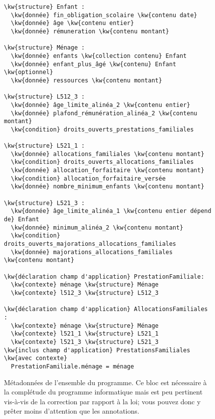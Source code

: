 \documentclass[12pt, french]{article}
\newcommand{\kw}[1]{\textbf{\textcolor{OliveGreen}{#1}}}
\newenvironment{metadata}{
  \begin{tcolorbox}[colframe=OliveGreen, title=\textcolor{black}{\texttt{Métadonnées}}, before skip=1em, after skip=1em]
}{
\end{tcolorbox}
}
\begin{document}
\begin{figure}[htpb]
\begin{metadata}
\begin{Verbatim}[commandchars=\\\{\}]
\kw{structure} Enfant :
  \kw{donnée} fin_obligation_scolaire \kw{contenu date}
  \kw{donnée} âge \kw{contenu entier}
  \kw{donnée} rémuneration \kw{contenu montant}

\kw{structure} Ménage :
  \kw{donnée} enfants \kw{collection contenu} Enfant
  \kw{donnée} enfant_plus_âgé \kw{contenu} Enfant \kw{optionnel}
  \kw{donnée} ressources \kw{contenu montant}

\kw{structure} L512_3 :
  \kw{donnée} âge_limite_alinéa_2 \kw{contenu entier}
  \kw{donnée} plafond_rémunération_alinéa_2 \kw{contenu montant}
  \kw{condition} droits_ouverts_prestations_familiales

\kw{structure} L521_1 :
  \kw{donnée} allocations_familiales \kw{contenu montant}
  \kw{condition} droits_ouverts_allocations_familiales
  \kw{donnée} allocation_forfaitaire \kw{contenu montant}
  \kw{condition} allocation_forfaitaire_versée
  \kw{donnée} nombre_minimum_enfants \kw{contenu montant}

\kw{structure} L521_3 :
  \kw{donnée} âge_limite_alinéa_1 \kw{contenu entier dépend de} Enfant
  \kw{donnée} minimum_alinéa_2 \kw{contenu montant}
  \kw{condition} droits_ouverts_majorations_allocations_familiales
  \kw{donnée} majorations_allocations_familiales \kw{contenu montant}

\kw{déclaration champ d'application} PrestationFamiliale:
  \kw{contexte} ménage \kw{structure} Ménage
  \kw{contexte} l512_3 \kw{structure} L512_3

\kw{déclaration champ d'application} AllocationsFamiliales :
  \kw{contexte} ménage \kw{structure} Ménage
  \kw{contexte} l521_1 \kw{structure} L521_1
  \kw{contexte} l521_3 \kw{structure} L521_3
\kw{inclus champ d'application} PrestationsFamiliales \kw{avec contexte}
  PrestationFamiliale.ménage = ménage
\end{Verbatim}
\end{metadata}
\caption{Métadonnées de l'ensemble du programme. Ce bloc est nécessaire à la complétude du programme informatique
mais est peu pertinent vis-à-vis de la correction par rapport à la loi; vous pouvez donc y prêter moins d'attention que les annotations.}
\end{figure}

\end{document}
